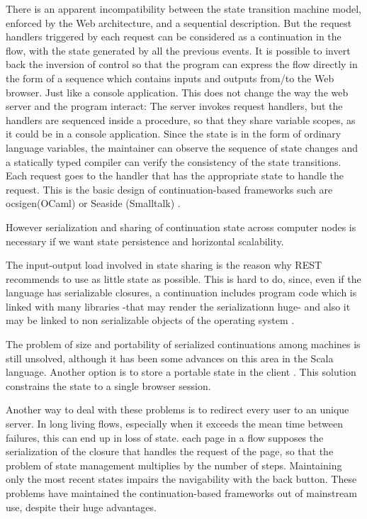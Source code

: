 \documentclass{tmr}
\begin{document}
 
There is an apparent incompatibility between the state transition machine model, enforced by the Web architecture, and a sequential description. But the request handlers triggered by each request can be considered as a continuation in the flow, with the state generated by all the previous events. It is possible to invert back the inversion of control\cite{invertingback} so that the program can express the flow directly in the form of a sequence which contains inputs and outputs from/to the Web browser. Just like a console application. This does not change the way the web server and the program interact: The server invokes request handlers, but  the handlers are sequenced inside a procedure, so that they share variable scopes, as it could be in a console application. Since the state is in the form of ordinary language variables, the maintainer can observe the sequence of state changes and a statically typed compiler can verify the consistency of the state transitions. Each request goes to the handler that has the appropriate state to handle the request. This is the basic design of continuation-based frameworks such are ocsigen(OCaml) \cite{auth:ocsigen} or Seaside (Smalltalk) \cite{auth:seaside}. 
 
However serialization  and sharing of continuation state across computer nodes is necessary if we want state persistence and horizontal scalability. 

The input-output load involved in state sharing is the reason why REST recommends to use as little state as possible. This is hard to do, since, even if the language has serializable closures, a continuation includes program code which is linked with many libraries -that may render the serializationn huge- and also it may be linked to non serializable objects of the operating system \cite{oleg}. 

The problem of size and portability of serialized continuations among machines is still unsolved, although it has been some advances on this area in the Scala language\cite{swarm}. Another option is to store a portable state in the client \cite{McCarthy:2009:ARW:1631687.1596594}. This solution constrains the state to a single browser session. 
 
Another way to deal with these problems is to redirect every user to an unique server. In long living flows, especially when it exceeds the mean time between failures, this can end up in loss of state. each page in a flow supposes the serialization of the closure that handles the request of the page, so that the problem of state management multiplies by the number of steps. Maintaining only the most recent states impairs the navigability with the back button. These problems have maintained the continuation-based frameworks out of  mainstream use, despite their huge advantages. 
 
\end{document}
